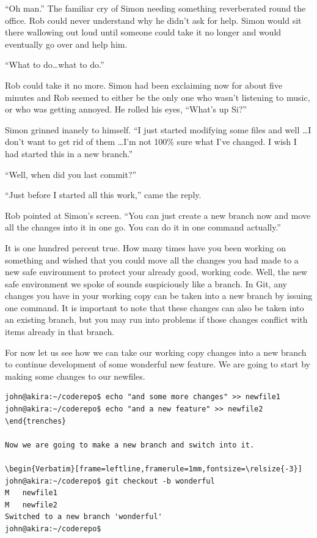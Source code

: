 \begin{trenches}
``Oh man.'' The familiar cry of Simon needing something reverberated round the office.  Rob could never understand why he didn't ask for help.  Simon would sit there wallowing out loud until someone could take it no longer and would eventually go over and help him.

``What to do\ldots what to do.''

Rob could take it no more.  Simon had been exclaiming now for about five minutes and Rob seemed to either be the only one who wasn't listening to music, or who was getting annoyed.  He rolled his eyes, ``What's up Si?''

Simon grinned inanely to himself.  ``I just started modifying some files and well \ldots I don't want to get rid of them \ldots I'm not 100\% sure what I've changed.  I wish I had started this in a new branch.''

``Well, when did you last commit?''

``Just before I started all this work,'' came the reply.

Rob pointed at Simon's screen.  ``You can just create a new branch now and move all the changes into it in one go.  You can do it in one command actually.''
\end{trenches}

It is one hundred percent true.  How many times have you been working on something and wished that you could move all the changes you had made to a new safe environment to protect your already good, working code.  Well, the new safe environment we spoke of sounds suspiciously like a branch.  In Git, any changes you have in your working copy can be taken into a new branch by issuing one command.  It is important to note that these changes can also be taken into an existing branch, but you may run into problems if those changes conflict with items already in that branch.

For now let us see how we can take our working copy changes into a new branch to continue development of some wonderful new feature.  We are going to start by making some changes to our newfiles.

\begin{Verbatim}[frame=leftline,framerule=1mm,fontsize=\relsize{-3}] 
john@akira:~/coderepo$ echo "and some more changes" >> newfile1
john@akira:~/coderepo$ echo "and a new feature" >> newfile2
\end{trenches}

Now we are going to make a new branch and switch into it.

\begin{Verbatim}[frame=leftline,framerule=1mm,fontsize=\relsize{-3}] 
john@akira:~/coderepo$ git checkout -b wonderful
M	newfile1
M	newfile2
Switched to a new branch 'wonderful'
john@akira:~/coderepo$ 
\end{Verbatim}

